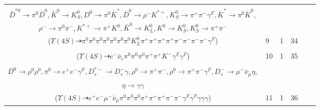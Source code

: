 \documentclass[landscape]{article}
\newcounter{rownumbers}
\newcommand\rn{\stepcounter{rownumbers}\arabic{rownumbers}}
\newcommand{\EOLP}{\\ \hline} %
\newcommand{\topoTags}[1]{#1} %
\begin{document}
\begin{longtable}{clcccc}
\rn & \makecell[l]{ $ 
\Upsilon(4S) \rightarrow B^{0} \bar{B}^{0} ,
B^{0} \rightarrow \pi^{0} \bar{D}^{0} ,
\bar{B}^{0} \rightarrow K^{*-} D^{*+} \bar{D}^{*0} ,
\bar{D}^{0} \rightarrow \pi^{0} \pi^{0} ,
K^{*-} \rightarrow \pi^{-} \bar{K}^{0} ,
D^{*+} \rightarrow \pi^{+} D^{0} ,
$ \\ $
\bar{D}^{*0} \rightarrow \pi^{0} \bar{D}^{0} ,
\bar{K}^{0} \rightarrow K_{S}^{0} ,
D^{0} \rightarrow \pi^{0} \bar{K}^{*} ,
\bar{D}^{0} \rightarrow \rho^{-} K^{*+} ,
K_{S}^{0} \rightarrow \pi^{+} \pi^{-} \gamma^{F} ,
\bar{K}^{*} \rightarrow \pi^{0} \bar{K}^{0} ,
$ \\ $
\rho^{-} \rightarrow \pi^{0} \pi^{-} ,
K^{*+} \rightarrow \pi^{+} K^{0} ,
\bar{K}^{0} \rightarrow K_{L}^{0} ,
K^{0} \rightarrow K_{S}^{0} ,
K_{S}^{0} \rightarrow \pi^{+} \pi^{-} 
$ \\ ($
\Upsilon(4S) \dashrightarrow \pi^{0} \pi^{0} \pi^{0} \pi^{0} \pi^{0} \pi^{0} \pi^{0} K_{L}^{0} \pi^{+} \pi^{+} \pi^{+} \pi^{+} \pi^{-} \pi^{-} \pi^{-} \pi^{-} \gamma^{F} 
$) } & \topoTags{9 & }1 & 34 \EOLP

\rn & \makecell[l]{ $ 
\Upsilon(4S) \rightarrow \bar{B}^{0} \bar{B}^{0} ,
\bar{B}^{0} \rightarrow \pi^{0} D^{0} ,
\bar{B}^{0} \rightarrow e^{-} \bar{\nu}_{e} D^{+} \gamma^{F} ,
D^{0} \rightarrow \pi^{0} \pi^{0} ,
D^{+} \rightarrow \pi^{+} \pi^{+} K^{-} \gamma^{F} 
$ \\ ($
\Upsilon(4S) \dashrightarrow e^{-} \bar{\nu}_{e} \pi^{0} \pi^{0} \pi^{0} \pi^{+} \pi^{+} K^{-} \gamma^{F} \gamma^{F} 
$) } & \topoTags{10 & }1 & 35 \EOLP

\rn & \makecell[l]{ $ 
\Upsilon(4S) \rightarrow B^{0} \bar{B}^{0} ,
B^{0} \rightarrow \pi^{0} \bar{D}^{0} ,
\bar{B}^{0} \rightarrow D^{*+} D_{s1}^{\prime-} ,
\bar{D}^{0} \rightarrow \pi^{0} \pi^{0} ,
D^{*+} \rightarrow \pi^{+} D^{0} ,
D_{s1}^{\prime-} \rightarrow \pi^{0} D_{s}^{*-} ,
$ \\ $
D^{0} \rightarrow \rho^{0} \rho^{0} ,
\pi^{0} \rightarrow e^{+} e^{-} \gamma^{F} ,
D_{s}^{*-} \rightarrow D_{s}^{-} \gamma ,
\rho^{0} \rightarrow \pi^{+} \pi^{-} ,
\rho^{0} \rightarrow \pi^{+} \pi^{-} \gamma^{F} ,
D_{s}^{-} \rightarrow \mu^{-} \bar{\nu}_{\mu} \eta ,
$ \\ $
\eta \rightarrow \gamma \gamma 
$ \\ ($
\Upsilon(4S) \dashrightarrow e^{+} e^{-} \mu^{-} \bar{\nu}_{\mu} \pi^{0} \pi^{0} \pi^{0} \pi^{+} \pi^{+} \pi^{+} \pi^{-} \pi^{-} \gamma^{F} \gamma^{F} \gamma \gamma \gamma 
$) } & \topoTags{11 & }1 & 36 \EOLP


\end{longtable}
\end{document}
